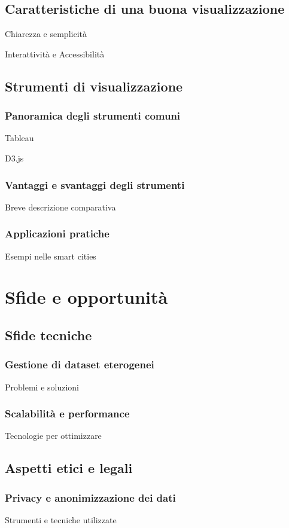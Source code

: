 \subsection{Caratteristiche di una buona visualizzazione}
Chiarezza e semplicità

Interattività e Accessibilità

\subsection{Strumenti di visualizzazione}
\subsubsection{Panoramica degli strumenti comuni}
Tableau

D3.js

\subsubsection{Vantaggi e svantaggi degli strumenti}
Breve descrizione comparativa

\subsubsection{Applicazioni pratiche}
Esempi nelle smart cities


\section{Sfide e opportunità}   %
\subsection{Sfide tecniche}
\subsubsection{Gestione di dataset eterogenei}
Problemi e soluzioni

\subsubsection{Scalabilità e performance}
Tecnologie per ottimizzare

\subsection{Aspetti etici e legali}
\subsubsection{Privacy e anonimizzazione dei dati}
Strumenti e tecniche utilizzate

